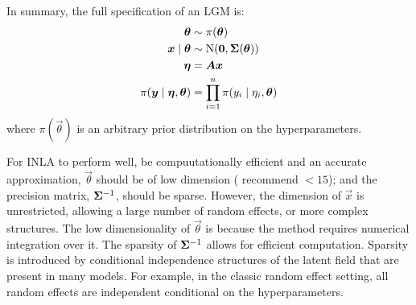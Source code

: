 \documentclass[thesis.tex]{subfiles}
\begin{document}
In summary, the full specification of an LGM is:
\begin{align}
    \bm{\theta} &\sim \pi(\bm{\theta}) \\
    \bm{x} \mid \bm{\theta} &\sim \operatorname{N}(\bm{0}, \bm{\Sigma}(\bm{\theta})) \\
    \bm{\eta} &= \bm{A} \bm{x} \\
    \pi(\bm{y} \mid \bm{\eta}, \bm{\theta}) &= \prod_{i=1}^n \pi(y_i \mid \eta_i, \bm{\theta})
\end{align}
where $\pi(\vec{\theta})$ is an arbitrary prior distribution on the hyperparameters.


For INLA to perform well, \ie be compuutationally efficient and an accurate approximation, $\vec{\theta}$ should be of low dimension (\textcite{martinoINLAtutorial} recommend $< 15$); and the precision matrix, $\bm{\Sigma}^{-1}$, should be sparse.
However, the dimension of $\vec{x}$ is unrestricted, allowing a large number of random effects, or more complex structures.
The low dimensionality of $\vec{\theta}$ is because the method requires numerical integration over it.
The sparsity of $\bm{\Sigma}^{-1}$ allows for efficient computation.
Sparsity is introduced by conditional independence structures of the latent field that are present in many models.
For example, in the classic random effect setting, all random effects are independent conditional on the hyperparameters.

\end{document}
